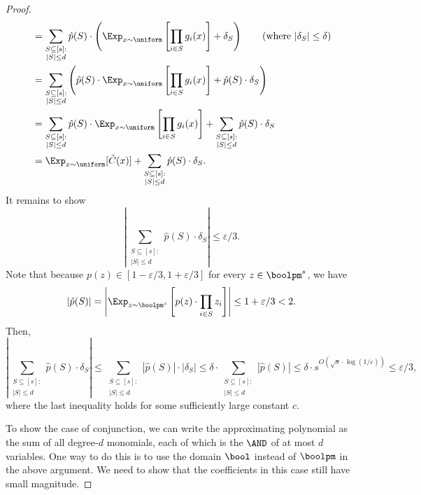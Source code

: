 \begin{proof}
\begin{align*}
        	&=\sum_{\substack{S\subseteq[s]: \\ |S|\leq d}}\hat{p}(S)\cdot\left(\Exp_{x\sim \uniform}\left[\prod_{i\in S}g_i(x)\right]+\delta_S\right) \tag{where $|\delta_S|\leq \delta$} \\
        	&=\sum_{\substack{S\subseteq[s]: \\ |S|\leq d}}\left(\hat{p}(S)\cdot\Exp_{x\sim \uniform}\left[\prod_{i\in S}g_i(x)\right]+\hat{p}(S)\cdot\delta_S\right)\\
        	&=\sum_{\substack{S\subseteq[s]: \\ |S|\leq d}}\hat{p}(S)\cdot\Exp_{x\sim \uniform}\left[\prod_{i\in S}g_i(x)\right]+\sum_{\substack{S\subseteq[s]: \\ |S|\leq d}} \hat{p}(S)\cdot\delta_S\\
        	&=\Exp_{x\sim \uniform}[\tilde{C}(x)]+\sum_{\substack{S\subseteq[s]: \\ |S|\leq d}} \hat{p}(S)\cdot \delta_S.
    	\end{align*}
    	It remains to show
    	\[
    		\left| \sum_{\substack{S\subseteq[s]: \\ |S|\leq d}} \hat{p}(S)\cdot \delta_S \right| \leq \varepsilon/3.
    	\]
    	Note that because $p(z)\in[1-\varepsilon/3,1+\varepsilon/3]$ for every $z\in\boolpm^s$, we have
    	\[
    		|\hat{p}(S)|=\left|\Exp_{z\sim \boolpm^s}\left[p(z)\cdot\prod_{i\in S} z_i\right]\right| \leq 1+\varepsilon/3 < 2.
    	\]
    	Then,
    	\[
    		\left|\sum_{\substack{S\subseteq[s]: \\ |S|\leq d}} \hat{p}(S)\cdot \delta_S \right| \leq  \sum_{\substack{S\subseteq[s]: \\ |S|\leq d}} |\hat{p}(S)|\cdot |\delta_S|\leq \delta \cdot \sum_{\substack{S\subseteq[s]: \\ |S|\leq d}} |\hat{p}(S)| \leq \delta\cdot s^{O(\sqrt{s}\cdot\log(1/\varepsilon))} \leq \varepsilon/3,
    	\]
    	where the last inequality holds for some sufficiently large constant $c$.
    	
    	To show the case of conjunction, we can write the approximating polynomial as the sum of all degree-$d$ monomials, each of which is the $\AND$ of at most $d$ variables. One way to do this is to use the domain $\bool$ instead of $\boolpm$ in the above argument. We need to show that the coefficients in this case still have small magnitude.
    	

\end{proof}
